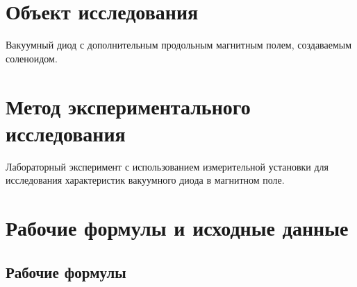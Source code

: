 \documentclass[14pt]{extarticle}
\begin{document}
\section{Объект исследования}

Вакуумный диод с дополнительным продольным магнитным полем, создаваемым соленоидом.

\section{Метод экспериментального исследования}

Лабораторный эксперимент с использованием измерительной установки для исследования характеристик вакуумного диода в магнитном поле.

\section{Рабочие формулы и исходные данные}

\subsection{Рабочие формулы}
\end{document}
